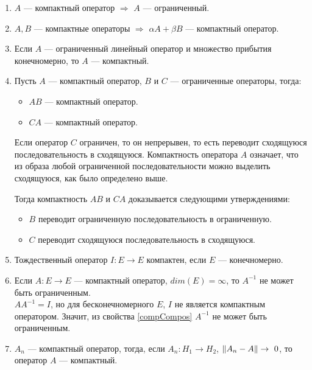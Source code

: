 \documentclass[12pt]{article}
\begin{document}
			\begin{enumerate}
				\item $A$ --- компактный оператор $\Rightarrow$ $A$ --- ограниченный.		
				\item $A, B$ --- компактные операторы $\Rightarrow$ $\alpha A + \beta B$ --- компактный оператор.		
				\item Если $A$ --- ограниченный линейный оператор и множество прибытия конечномерно, то $A$ --- компактный. \label{compArea}
				\item Пусть $A$ --- компактный оператор, $B$ и $C$ --- ограниченные операторы, тогда: \label{compCompos}
					\begin{itemize}
						\item $AB$ --- компактный оператор.
						\item $CA$ --- компактный оператор.
					\end{itemize}
		
					Если оператор $C$ ограничен, то он непрерывен, то есть переводит сходящуюся последовательность 
					в сходящуюся. Компактность оператора $A$ означает, что из образа любой ограниченной 
					последовательности можно выделить сходящуюся, как было определено выше.
		
					Тогда компактность $AB$ и $CA$ доказывается следующими утверждениями:
					\begin{itemize}
						\item $B$ переводит ограниченную последовательность в ограниченную.
						\item $C$ переводит сходящуюся последовательность в сходящуюся.
					\end{itemize}		
				\item Тождественный оператор $I:E\rightarrow E$ компактен, если $E$ --- конечномерно.
				\item Если $A:E \rightarrow E$ --- компактный оператор, $dim(E) = \infty$, то $A^{-1}$ не может быть ограниченным. \\

					$A A^{-1} = I$, но для бесконечномерного $E$, $I$ не является компактным оператором. Значит, 
					из свойства \ref{compCompos} $A^{-1}$ не может быть ограниченным.
				\item $A_n$ --- компактный оператор, тогда, если $A_n:H_1 \rightarrow H_2$, $\left\| A_n - A \right\| \rightarrow~0$, то 
				оператор $A$ --- компактный. \label{compLim}
		

\end{enumerate}
\end{document}
